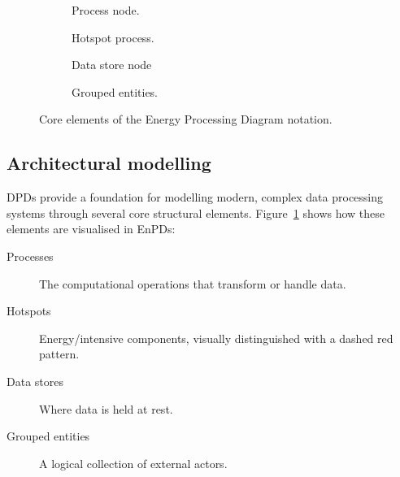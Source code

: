 \documentclass[11pt,a4paper]{article}
\newcommand{\enpdStore}[5][]{%
  \node[enpd/store,#1] (#2) {#3};%
  \node[enpd/label,anchor=south east] at (#2.north east) {#4};%
  \def\enpdtmp{#5}\ifx\enpdtmp\empty\else
    \node[enpd/label,anchor=north] at (#2.south) {[$#5$]};%
  \fi
}
\newcommand{\enpdProcess}[4][]{%
  \node[enpd/process,#1] (#2) {#3};%
  \def\enpdtmp{#4}\ifx\enpdtmp\empty\else
    \node[enpd/label,anchor=north] at (#2.south) {[$#4$]};%
  \fi
}
\newcommand{\enpdHotspot}[4][]{%
  \node[enpd/hotspot,#1] (#2) {#3};%
  \def\enpdtmp{#4}\ifx\enpdtmp\empty\else
    \node[enpd/label,anchor=north] at (#2.south) {[$#4$]};%
  \fi
}
\newcommand{\enpdGroup}[4][]{%
  \node[enpd/group,#1] (#2) {#3};%
  \node[enpd/label,anchor=south east] at ([xshift=2ex,yshift=2ex]#2.north east) {#4};%
  \begin{scope}[on background layer]%
    \draw[fill=white] ([xshift=2ex,yshift=2ex]#2.north west) rectangle ([xshift=2ex,yshift=2ex]#2.south east);%
    \draw[fill=white] ([xshift=1ex,yshift=1ex]#2.north west) rectangle ([xshift=1ex,yshift=1ex]#2.south east);%
  \end{scope}%
}
\begin{document}
\begin{figure}[ht]
  \begin{subfigure}[b]{0.23\linewidth}
    \centering
    \caption{Process node.}
  \end{subfigure}
  \hfill
  \begin{subfigure}[b]{0.23\linewidth}
    \centering
    \caption{Hotspot process.}
  \end{subfigure}
  \hfill
  \begin{subfigure}[b]{0.23\linewidth}
    \centering
    \caption{Data store node}
  \end{subfigure}
  \hfill
  \begin{subfigure}[b]{0.23\linewidth}
    \centering
    \caption{Grouped entities.}
  \end{subfigure}
  \caption{Core elements of the Energy Processing Diagram notation.}%
  \label{fig:elements}
\end{figure}

\subsection{Architectural modelling}
DPDs provide a foundation for modelling modern, complex data processing systems through several core structural elements.
Figure~\ref{fig:elements} shows how these elements are visualised in EnPDs:
\begin{description}
  \item[Processes] The computational operations that transform or handle data.
  \item[Hotspots] Energy\-/intensive components, visually distinguished with a dashed red pattern.
  \item[Data stores] Where data is held at rest.
  \item[Grouped entities] A logical collection of external actors.
\end{description}
\end{document}

